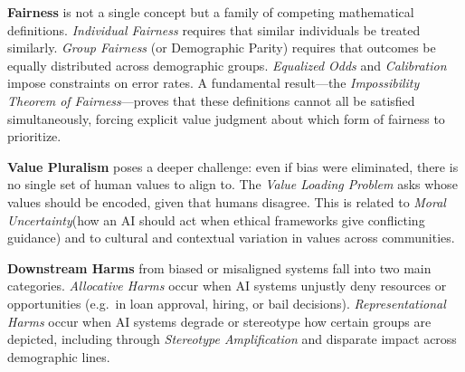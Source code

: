 \textbf{Fairness} is not a single concept but a family of competing
mathematical definitions. \textit{Individual Fairness} requires that similar individuals be treated similarly. \textit{Group Fairness} (or Demographic Parity) requires that outcomes be equally distributed across demographic groups. \textit{Equalized Odds} and \textit{Calibration} impose constraints on error rates. A fundamental result---the \textit{Impossibility Theorem of Fairness}---proves that these definitions cannot all be satisfied simultaneously, forcing explicit value judgment about which form of fairness to prioritize.

\textbf{Value Pluralism} poses a deeper challenge: even if bias were eliminated, there is no single set of human values to align to. The \textit{Value Loading Problem} asks whose values should be encoded, given that humans disagree. This is related to \textit{Moral Uncertainty}(how an AI should act when ethical frameworks give conflicting guidance) and to cultural and contextual variation in values across communities.

\textbf{Downstream Harms} from biased or misaligned systems fall into two main categories. \textit{Allocative Harms} occur when AI systems unjustly deny resources or opportunities (e.g.\ in loan approval, hiring, or bail decisions). \textit{Representational Harms} occur when AI systems degrade or stereotype how certain groups are depicted, including through \textit{Stereotype Amplification} and disparate impact across demographic lines.
